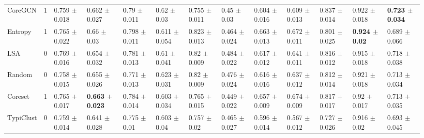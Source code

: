 \documentclass[]{article}
\begin{document}
\begin{table}[H]
{\begin{tabular}{l|llllllllllll}
			CoreGCN & 1 & 0.759 $\pm$ {\small 0.018} & 0.662 $\pm$ {\small 0.027} & 0.79 $\pm$ {\small 0.011} & 0.62 $\pm$ {\small 0.03} & 0.755 $\pm$ {\small 0.011} & 0.45 $\pm$ {\small 0.03} & 0.604 $\pm$ {\small 0.016} & 0.609 $\pm$ {\small 0.013} & 0.837 $\pm$ {\small 0.014} & 0.922 $\pm$ {\small 0.018} & \textbf{0.723 $\pm$ {\small 0.034}} \\
			
			Entropy & 1 & 0.765 $\pm$ {\small 0.022} & 0.66 $\pm$ {\small 0.03} & 0.798 $\pm$ {\small 0.011} & 0.611 $\pm$ {\small 0.054} & 0.823 $\pm$ {\small 0.013} & 0.464 $\pm$ {\small 0.024} & 0.663 $\pm$ {\small 0.013} & 0.672 $\pm$ {\small 0.011} & 0.801 $\pm$ {\small 0.025} & \textbf{0.924 $\pm$ {\small 0.02}} & 0.689 $\pm$ {\small 0.066} \\
			
			LSA & 0 & 0.769 $\pm$ {\small 0.016} & 0.654 $\pm$ {\small 0.032} & 0.781 $\pm$ {\small 0.013} & 0.61 $\pm$ {\small 0.041} & 0.82 $\pm$ {\small 0.009} & 0.484 $\pm$ {\small 0.022} & 0.617 $\pm$ {\small 0.012} & 0.641 $\pm$ {\small 0.011} & 0.816 $\pm$ {\small 0.012} & 0.915 $\pm$ {\small 0.018} & 0.718 $\pm$ {\small 0.038} \\
			
			Random & 0 & 0.758 $\pm$ {\small 0.015} & 0.655 $\pm$ {\small 0.026} & 0.771 $\pm$ {\small 0.013} & 0.623 $\pm$ {\small 0.031} & 0.82 $\pm$ {\small 0.009} & 0.476 $\pm$ {\small 0.024} & 0.616 $\pm$ {\small 0.016} & 0.637 $\pm$ {\small 0.012} & 0.812 $\pm$ {\small 0.014} & 0.921 $\pm$ {\small 0.018} & 0.713 $\pm$ {\small 0.034} \\
			
			Coreset & 1 & 0.765 $\pm$ {\small 0.017} & \textbf{0.663 $\pm$ {\small 0.023}} & 0.784 $\pm$ {\small 0.014} & 0.603 $\pm$ {\small 0.034} & 0.765 $\pm$ {\small 0.015} & 0.449 $\pm$ {\small 0.022} & 0.657 $\pm$ {\small 0.009} & 0.674 $\pm$ {\small 0.009} & 0.817 $\pm$ {\small 0.017} & 0.92 $\pm$ {\small 0.017} & 0.713 $\pm$ {\small 0.035} \\
			
			TypiClust & 0 & 0.759 $\pm$ {\small 0.014} & 0.641 $\pm$ {\small 0.028} & 0.775 $\pm$ {\small 0.01} & 0.603 $\pm$ {\small 0.04} & 0.757 $\pm$ {\small 0.02} & 0.465 $\pm$ {\small 0.027} & 0.596 $\pm$ {\small 0.014} & 0.567 $\pm$ {\small 0.012} & 0.727 $\pm$ {\small 0.026} & 0.916 $\pm$ {\small 0.02} & 0.693 $\pm$ {\small 0.045} \\
		\end{tabular}
	}
\end{table}
\end{document}
